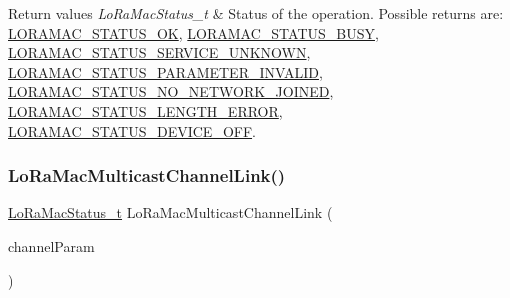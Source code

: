 \begin{DoxyRetVals}{Return values}
{\em Lo\+Ra\+Mac\+Status\+\_\+t} & Status of the operation. Possible returns are\+: \hyperlink{group__LORAMAC_gga1d18f26b344040b3ec5c3db662919661a03db5fca052313edb3823c014b653a74}{L\+O\+R\+A\+M\+A\+C\+\_\+\+S\+T\+A\+T\+U\+S\+\_\+\+OK}, \hyperlink{group__LORAMAC_gga1d18f26b344040b3ec5c3db662919661a66b12f569207eacd97ee1c1d6c4cee6d}{L\+O\+R\+A\+M\+A\+C\+\_\+\+S\+T\+A\+T\+U\+S\+\_\+\+B\+U\+SY}, \hyperlink{group__LORAMAC_gga1d18f26b344040b3ec5c3db662919661aff502a87db22d6a9a4919e4b54c7c1cf}{L\+O\+R\+A\+M\+A\+C\+\_\+\+S\+T\+A\+T\+U\+S\+\_\+\+S\+E\+R\+V\+I\+C\+E\+\_\+\+U\+N\+K\+N\+O\+WN}, \hyperlink{group__LORAMAC_gga1d18f26b344040b3ec5c3db662919661ad0d3119f247d00e1787dda106fcb3017}{L\+O\+R\+A\+M\+A\+C\+\_\+\+S\+T\+A\+T\+U\+S\+\_\+\+P\+A\+R\+A\+M\+E\+T\+E\+R\+\_\+\+I\+N\+V\+A\+L\+ID}, \hyperlink{group__LORAMAC_gga1d18f26b344040b3ec5c3db662919661a105228330376111d46d99d57688a20ae}{L\+O\+R\+A\+M\+A\+C\+\_\+\+S\+T\+A\+T\+U\+S\+\_\+\+N\+O\+\_\+\+N\+E\+T\+W\+O\+R\+K\+\_\+\+J\+O\+I\+N\+ED}, \hyperlink{group__LORAMAC_gga1d18f26b344040b3ec5c3db662919661a4ab40311dcd2eeffc77f573a919b29b1}{L\+O\+R\+A\+M\+A\+C\+\_\+\+S\+T\+A\+T\+U\+S\+\_\+\+L\+E\+N\+G\+T\+H\+\_\+\+E\+R\+R\+OR}, \hyperlink{group__LORAMAC_gga1d18f26b344040b3ec5c3db662919661aff1d3a91250809d1770a74776057b8ce}{L\+O\+R\+A\+M\+A\+C\+\_\+\+S\+T\+A\+T\+U\+S\+\_\+\+D\+E\+V\+I\+C\+E\+\_\+\+O\+FF}. \\
\hline
\end{DoxyRetVals}
\mbox{\label{group__LORAMAC_ga89622bf6a1705558ba7b76dbb2d59c2f}} 
\subsubsection{\texorpdfstring{Lo\+Ra\+Mac\+Multicast\+Channel\+Link()}{LoRaMacMulticastChannelLink()}}
{\footnotesize\ttfamily \hyperlink{group__LORAMAC_ga30bd25657e10480f8605ee951b0ecfbd}{Lo\+Ra\+Mac\+Status\+\_\+t} Lo\+Ra\+Mac\+Multicast\+Channel\+Link (\begin{DoxyParamCaption}\item[{\hyperlink{group__LORAMAC_ga02d2523505cac70954c043074087ea65}{Multicast\+Params\+\_\+t} $\ast$}]{channel\+Param }\end{DoxyParamCaption})}



